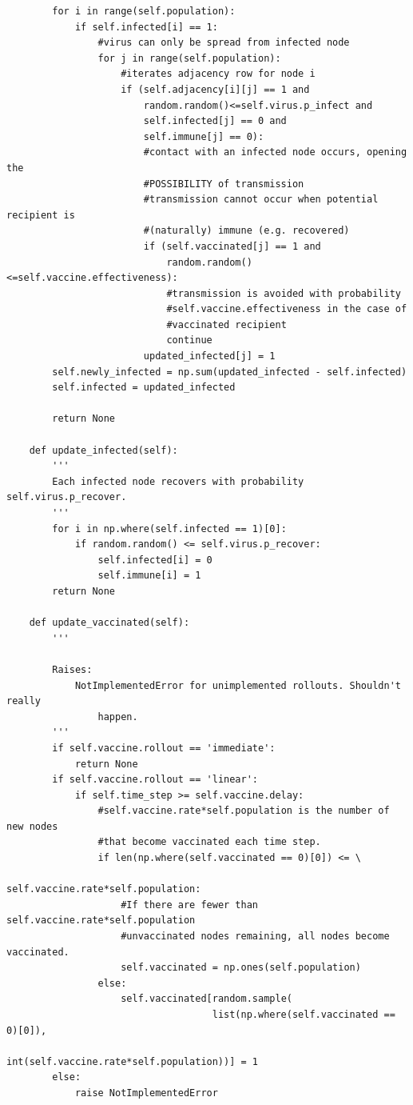 \documentclass[psamsfonts]{amsart}
\theoremstyle{definition}
\theoremstyle{remark}
\numberwithin{equation}{section}
\begin{document}
\begin{verbatim}
        for i in range(self.population):
            if self.infected[i] == 1:
                #virus can only be spread from infected node
                for j in range(self.population):
                    #iterates adjacency row for node i
                    if (self.adjacency[i][j] == 1 and
                        random.random()<=self.virus.p_infect and
                        self.infected[j] == 0 and
                        self.immune[j] == 0):
                        #contact with an infected node occurs, opening the
                        #POSSIBILITY of transmission
                        #transmission cannot occur when potential recipient is
                        #(naturally) immune (e.g. recovered)
                        if (self.vaccinated[j] == 1 and
                            random.random()<=self.vaccine.effectiveness):
                            #transmission is avoided with probability
                            #self.vaccine.effectiveness in the case of
                            #vaccinated recipient
                            continue
                        updated_infected[j] = 1
        self.newly_infected = np.sum(updated_infected - self.infected)
        self.infected = updated_infected

        return None

    def update_infected(self):
        '''
        Each infected node recovers with probability self.virus.p_recover.
        '''
        for i in np.where(self.infected == 1)[0]:
            if random.random() <= self.virus.p_recover:
                self.infected[i] = 0
                self.immune[i] = 1
        return None

    def update_vaccinated(self):
        '''

        Raises:
            NotImplementedError for unimplemented rollouts. Shouldn't really
                happen.
        '''
        if self.vaccine.rollout == 'immediate':
            return None
        if self.vaccine.rollout == 'linear':
            if self.time_step >= self.vaccine.delay:
                #self.vaccine.rate*self.population is the number of new nodes
                #that become vaccinated each time step.
                if len(np.where(self.vaccinated == 0)[0]) <= \
                                            self.vaccine.rate*self.population:
                    #If there are fewer than self.vaccine.rate*self.population
                    #unvaccinated nodes remaining, all nodes become vaccinated.
                    self.vaccinated = np.ones(self.population)
                else:
                    self.vaccinated[random.sample(
                                    list(np.where(self.vaccinated == 0)[0]),
                                    int(self.vaccine.rate*self.population))] = 1
        else:
            raise NotImplementedError


\end{verbatim}
\end{document}
